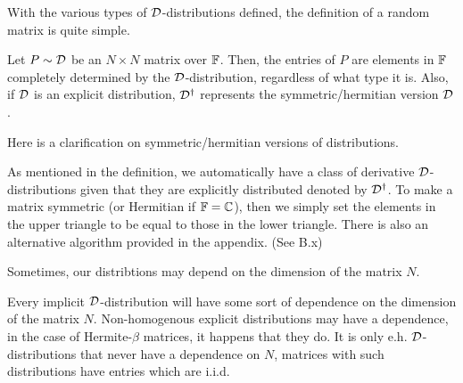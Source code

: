 With the various types of $\mathcal{D}$-distributions defined, the definition of a random matrix is quite simple.

\begin{definition}
Let $P \sim \mathcal{D}$ be an $N \times N$ matrix over $\mathbb{F}$. Then, the entries of $P$ are elements in $\mathbb{F}$ completely determined by the $\mathcal{D}$-distribution, regardless of what type it is.
Also, if $\mathcal{D}$ is an explicit distribution, $\mathcal{D}^\dagger$ represents the symmetric/hermitian version $\mathcal{D}$.
\end{definition}


Here is a clarification on symmetric/hermitian versions of distributions.

\begin{remark}
As mentioned in the definition, we automatically have a class of derivative $\mathcal{D}$-distributions given that they are explicitly distributed denoted by $\mathcal{D}^\dagger$. To make a matrix symmetric
(or Hermitian if $\mathbb{F} = \mathbb{C}$), then we simply set the elements in the upper triangle to be equal to those in the lower triangle. There is also an alternative algorithm provided in the appendix. (See B.x)
\end{remark}

Sometimes, our distribtions may depend on the dimension of the matrix $N$.

\begin{remark}[Dependence on $N$]
Every implicit $\mathcal{D}$-distribution will have some sort of dependence on the dimension of the matrix $N$.
Non-homogenous explicit distributions may have a dependence, in the case of Hermite-$\beta$ matrices, it happens that they do.
It is only e.h. $\mathcal{D}$-distributions that never have a dependence on $N$, matrices with such distributions have entries which are i.i.d.
\end{remark}

